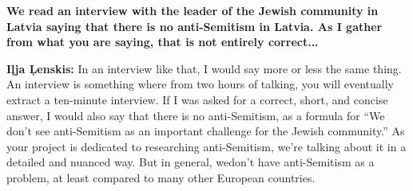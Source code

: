 \textbf{We read an interview with the leader of the Jewish community in Latvia saying that there is no anti-Semitism in Latvia. As I gather from what you are saying, that is not entirely correct...} 

\textbf{Iļja Ļenskis:} In an interview like that, I would say more or less the same thing. An interview is something where from two hours of talking, you will eventually extract a ten-minute interview. If I was asked for a correct, short, and concise answer, I would also say that there is no anti-Semitism, as a formula for ``We don’t see anti-Semitism as an important challenge for the Jewish community.'' As your project is dedicated to researching anti-Semitism, we’re talking about it in a detailed and nuanced way. But in general, wedon’t have anti-Semitism as a problem, at least compared to many other European countries.

